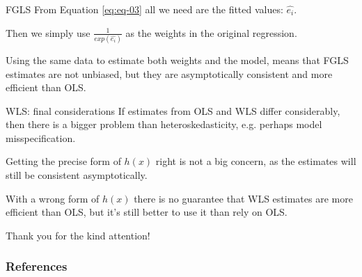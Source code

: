 \documentclass[12pt,english,pdf,xcolor=dvipsnames,aspectratio=169,handout]{beamer}\usepackage[]{graphicx}\usepackage[]{xcolor}
\begin{document}
 \begin{frame}{FGLS}
   From Equation \ref{eq:eq-03} all we need are the fitted values: $\hat{e_i}$.\bigskip

   Then we simply use $\frac{1}{exp(\hat{e_i})}$ as the weights in the original regression.\bigskip

   Using the same data to estimate both weights and the model, means that FGLS estimates are not unbiased, but they are asymptotically consistent and more efficient than OLS.

 \end{frame}


 \begin{frame}{WLS: final considerations}
   If estimates from OLS and WLS differ considerably, then there is a bigger problem than heteroskedasticity, e.g. perhaps model misspecification.\bigskip

   Getting the precise form of $h(x)$ right is not a big concern, as the estimates will still be consistent asymptotically.\bigskip

   With a wrong form of $h(x)$ there is no guarantee that WLS estimates are more efficient than OLS, but it's still better to use it than rely on OLS.
 \end{frame}



\begin{frame}
\begin{center}
    \Huge Thank \textcolor{title}{you} for the kind attention!
\end{center}
\end{frame}


\begin{frame}
\frametitle{References}


\end{frame}
\end{document}
